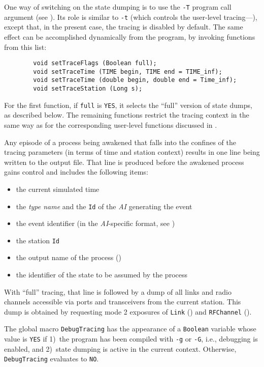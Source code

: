 One way of switching on the state dumping is to use the {\tt -T} program call
argument (see ).
Its role is similar to {\tt -t} (which controls the user-level
tracing---), except that, in the present case, the
tracing is disabled by default.
The same effect can be accomplished dynamically from the program, by
invoking functions from this list:

\begin{verbatim}
        void setTraceFlags (Boolean full);
        void setTraceTime (TIME begin, TIME end = TIME_inf);
        void setTraceTime (double begin, double end = Time_inf);
        void setTraceStation (Long s);
\end{verbatim}

\noindent
For the first function,
if {\tt full} is {\tt YES}, it selects the ``full'' version of state
dumps, as described below.
The remaining functions restrict the tracing context in the same way
as for the corresponding user-level functions discussed in .

Any episode of a process being awakened that falls into the confines of the
tracing parameters (in terms of time and station context)
results in one line being written to the output file.
That line is produced before the awakened process gains control and
includes the following items:

\begin{itemize}
\item
the current simulated time
\item
the {\em type name\/} and the {\tt Id} of the {\em AI\/} generating the event
\item
the event identifier (in the {\em AI\/}-specific format, see )
\item
the station {\tt Id}
\item
the output name of the process ()
\item
the identifier of the state to be assumed by the process
\end{itemize}

With ``full'' tracing, that line is followed by a
dump of all links and radio channels accessible via
ports and transceivers from the current station.
This dump is obtained by requesting mode 2 exposures of
{\tt Link} () and {\tt RFChannel}
().

The global macro {\tt DebugTracing} has the appearance of a {\tt Boolean}
variable whose value is {\tt YES} if 1)~the program has been compiled with
{\tt -g} or {\tt -G}, i.e.,
debugging is enabled, and 2)~state dumping is active in the
current context.
Otherwise, {\tt DebugTracing} evaluates to {\tt NO}.

